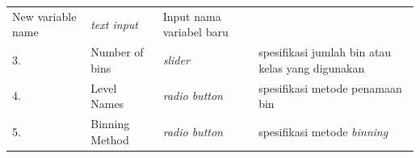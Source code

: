 \documentclass[12pt,]{krantz}
\begin{document}
\begin{longtable}[]{@{}llll@{}}
\begin{minipage}[t]{0.14\columnwidth}
New variable name\strut
\end{minipage} & \begin{minipage}[t]{0.09\columnwidth}\raggedright
\emph{text input}\strut
\end{minipage} & \begin{minipage}[t]{0.61\columnwidth}\raggedright
Input nama variabel baru\strut
\end{minipage}\tabularnewline
\begin{minipage}[t]{0.04\columnwidth}\raggedright
3.\strut
\end{minipage} & \begin{minipage}[t]{0.14\columnwidth}\raggedright
Number of bins\strut
\end{minipage} & \begin{minipage}[t]{0.09\columnwidth}\raggedright
\emph{slider}\strut
\end{minipage} & \begin{minipage}[t]{0.61\columnwidth}\raggedright
spesifikasi jumlah bin atau kelas yang digunakan\strut
\end{minipage}\tabularnewline
\begin{minipage}[t]{0.04\columnwidth}\raggedright
4.\strut
\end{minipage} & \begin{minipage}[t]{0.14\columnwidth}\raggedright
Level Names\strut
\end{minipage} & \begin{minipage}[t]{0.09\columnwidth}\raggedright
\emph{radio button}\strut
\end{minipage} & \begin{minipage}[t]{0.61\columnwidth}\raggedright
spesifikasi metode penamaan bin\strut
\end{minipage}\tabularnewline
\begin{minipage}[t]{0.04\columnwidth}\raggedright
5.\strut
\end{minipage} & \begin{minipage}[t]{0.14\columnwidth}\raggedright
Binning Method\strut
\end{minipage} & \begin{minipage}[t]{0.09\columnwidth}\raggedright
\emph{radio button}\strut
\end{minipage} & \begin{minipage}[t]{0.61\columnwidth}\raggedright
spesifikasi metode \emph{binning}\strut
\end{minipage}\tabularnewline
\bottomrule
\end{longtable}
\end{document}
